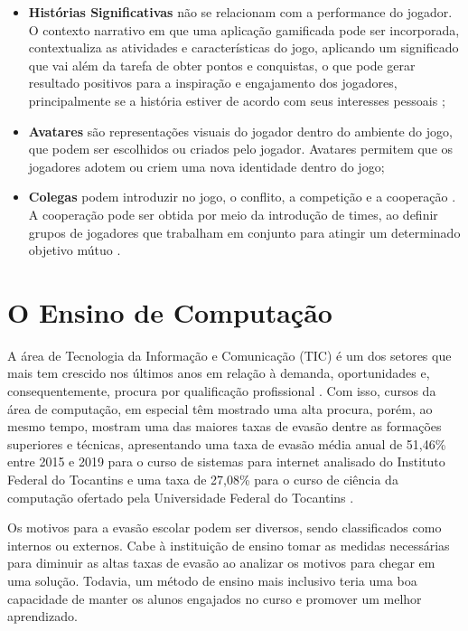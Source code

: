 \begin{itemize}
    \item \textbf{Histórias Significativas} não se relacionam com a performance do jogador. O contexto narrativo em que uma aplicação gamificada pode ser incorporada, contextualiza as atividades e características do jogo, aplicando um significado que vai além da tarefa de obter pontos e conquistas, o que pode gerar resultado positivos para a inspiração e engajamento dos jogadores, principalmente se a história estiver de acordo com seus interesses pessoais \cite{meaningful-gamification};
    \item \textbf{Avatares} são representações visuais do jogador dentro do ambiente do jogo, que podem ser escolhidos ou criados pelo jogador. Avatares permitem que os jogadores adotem ou criem uma nova identidade dentro do jogo;
    \item \textbf{Colegas} podem introduzir no jogo, o conflito, a competição e a cooperação \cite{kapp_gamification}. A cooperação pode ser obtida por meio da introdução de times, ao definir grupos de jogadores que trabalham em conjunto para atingir um determinado objetivo mútuo \cite{ranking_motivation}.
\end{itemize}

\section{O Ensino de Computação}

A área de Tecnologia da Informação e Comunicação (TIC) é um dos setores que mais tem crescido nos últimos anos em relação à demanda, oportunidades e, consequentemente, procura por qualificação profissional \cite{brasscom-tic}. Com isso, cursos da área de computação, em especial têm mostrado uma alta procura, porém, ao mesmo tempo, mostram uma das maiores taxas de evasão dentre as formações superiores e técnicas, apresentando uma taxa de evasão média anual de 51,46\% entre 2015 e 2019 para o curso de sistemas para internet analisado do Instituto Federal do Tocantins e uma taxa de 27,08\% para o curso de ciência da computação ofertado pela Universidade Federal do Tocantins \cite{evasao-computacao}.

Os motivos para a evasão escolar podem ser diversos, sendo classificados como internos ou externos. Cabe à instituição de ensino tomar as medidas necessárias para diminuir as altas taxas de evasão ao analizar os motivos para chegar em uma solução. Todavia, um método de ensino mais inclusivo teria uma boa capacidade de manter os alunos engajados no curso e promover um melhor aprendizado.

